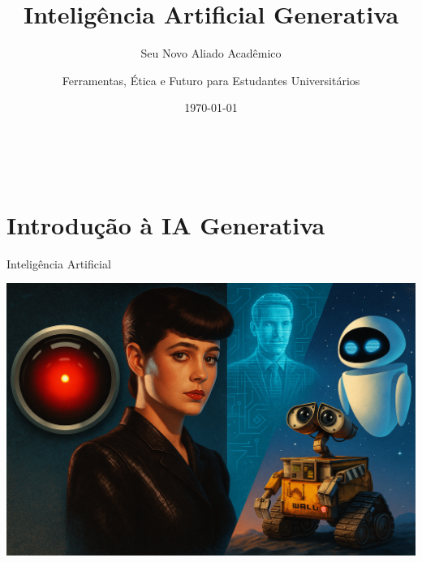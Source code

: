 \documentclass[aspectratio=169,12pt]{beamer}
\title[IA Generativa]{Inteligência Artificial Generativa}
\subtitle{Seu Novo Aliado Acadêmico}
\author{Ferramentas, Ética e Futuro para Estudantes Universitários}
\institute{Unesp}
\date{\today}
\begin{document}

\begin{frame}
    \titlepage
    \begin{center}
        \textcolor{accent}{\faRobot\, \faBrain\, \faGraduationCap}
    \end{center}
\end{frame}


\section{Introdução à IA Generativa}

\begin{frame}{Inteligência Artificial}
    \begin{center}
        
\includegraphics[scale=0.2]{diferentesia.png}
    \end{center}
\end{frame}
\end{document}
